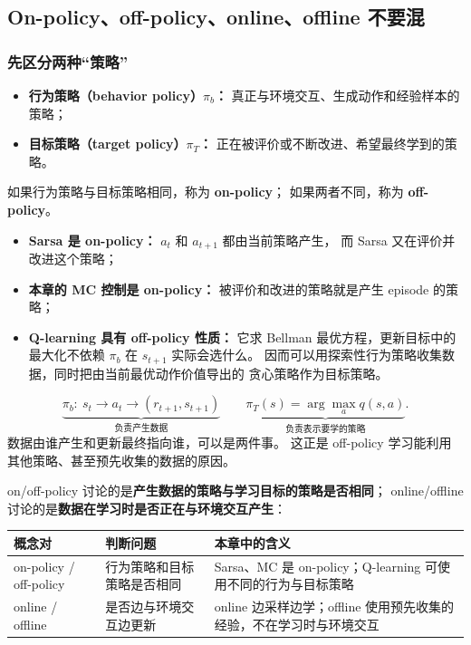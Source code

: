 \documentclass[11pt,a4paper,fontset=fandol]{ctexart}
\begin{document}
\subsection{On-policy、off-policy、online、offline 不要混}

\subsubsection{先区分两种“策略”}

\begin{itemize}
  \item \textbf{行为策略（behavior policy）\(\pi_b\)：}
  真正与环境交互、生成动作和经验样本的策略；
  \item \textbf{目标策略（target policy）\(\pi_T\)：}
  正在被评价或不断改进、希望最终学到的策略。
\end{itemize}

如果行为策略与目标策略相同，称为 \textbf{on-policy}；
如果两者不同，称为 \textbf{off-policy}。

\begin{itemize}
  \item \textbf{Sarsa 是 on-policy：}
  \(a_t\) 和 \(a_{t+1}\) 都由当前策略产生，
  而 Sarsa 又在评价并改进这个策略；
  \item \textbf{本章的 MC 控制是 on-policy：}
  被评价和改进的策略就是产生 episode 的策略；
  \item \textbf{Q-learning 具有 off-policy 性质：}
  它求 Bellman 最优方程，更新目标中的最大化不依赖
  \(\pi_b\) 在 \(s_{t+1}\) 实际会选什么。
  因而可以用探索性行为策略收集数据，同时把由当前最优动作价值导出的
  贪心策略作为目标策略。
\end{itemize}

\begin{intuitionbox}
\[
\underbrace{\pi_b:\ s_t\longrightarrow a_t
\longrightarrow(r_{t+1},s_{t+1})}_{\text{负责产生数据}}
\qquad
\underbrace{\pi_T(s)=\arg\max_a q(s,a)}_{\text{负责表示要学的策略}}.
\]
数据由谁产生和更新最终指向谁，可以是两件事。
这正是 off-policy 学习能利用其他策略、甚至预先收集的数据的原因。
\end{intuitionbox}

on/off-policy 讨论的是\textbf{产生数据的策略与学习目标的策略是否相同}；
online/offline 讨论的是\textbf{数据在学习时是否正在与环境交互产生}：

\begin{center}
\begin{tabularx}{\textwidth}{
  >{\raggedright\arraybackslash}p{}
  >{\raggedright\arraybackslash}p{}
  X}
\toprule
概念对 & 判断问题 & 本章中的含义\\
\midrule
on-policy / off-policy &
行为策略和目标策略是否相同 &
Sarsa、MC 是 on-policy；Q-learning 可使用不同的行为与目标策略\\
online / offline &
是否边与环境交互边更新 &
online 边采样边学；offline 使用预先收集的经验，不在学习时与环境交互\\
\bottomrule
\end{tabularx}
\end{center}
\end{document}
